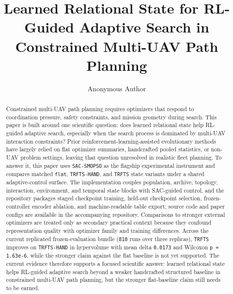 \documentclass[a4paper,fleqn]{cas-dc}
\begin{document}
\let\WriteBookmarks\relax
\def\floatpagepagefraction{1}
\def\textpagefraction{.001}


\title[mode=title]{Learned Relational State for RL-Guided Adaptive Search in Constrained Multi-UAV Path Planning}

\author[1]{Anonymous Author}

\begin{abstract}
Constrained multi-UAV path planning requires optimizers that respond to coordination pressure, safety constraints, and mission geometry during search. This paper is built around one scientific question: does learned relational state help RL-guided adaptive search, especially when the search process is dominated by multi-UAV interaction constraints? Prior reinforcement-learning-assisted evolutionary methods have largely relied on flat optimizer summaries, handcrafted pooled statistics, or non-UAV problem settings, leaving that question unresolved in realistic fleet planning. To answer it, this paper uses \texttt{SAC-SMOPSO} as the flagship experimental instrument and compares matched \texttt{flat}, \texttt{TRFTS-HAND}, and \texttt{TRFTS} state variants under a shared adaptive-control surface. The implementation couples population, archive, topology, interaction, environment, and temporal state blocks with SAC-guided control, and the repository packages staged checkpoint training, held-out checkpoint selection, frozen-controller encoder ablation, and machine-readable table export; source code and paper configs are available in the accompanying repository. Comparisons to stronger external optimizers are treated only as secondary practical context because they confound representation quality with optimizer family and training differences. Across the current replicated frozen-evaluation bundle (\texttt{810} runs over three replicas), \texttt{TRFTS} improves on \texttt{TRFTS-HAND} in hypervolume with mean delta \texttt{0.0173} and Wilcoxon \texttt{p = 1.63e-6}, while the stronger claim against the flat baseline is not yet supported. The current evidence therefore supports a focused scientific answer: learned relational state helps RL-guided adaptive search beyond a weaker handcrafted structured baseline in constrained multi-UAV path planning, but the stronger flat-baseline claim still needs to be earned.
\end{abstract}
\end{document}
